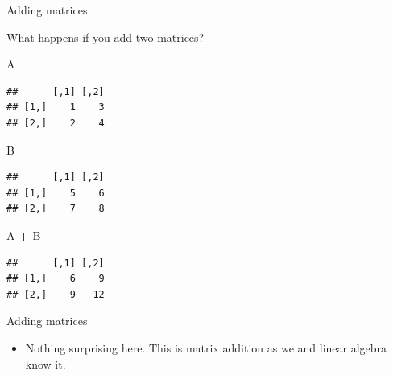 \documentclass[ignorenonframetext,]{beamer}
\newenvironment{Shaded}{\begin{snugshade}}{\end{snugshade}}
\newcommand{\NormalTok}[1]{#1}
\newcommand{\OperatorTok}[1]{\textcolor[rgb]{0.81,0.36,0.00}{\textbf{#1}}}
\newcommand{\StringTok}[1]{\textcolor[rgb]{0.31,0.60,0.02}{#1}}
\providecommand{\tightlist}{%
  \setlength{\itemsep}{0pt}\setlength{\parskip}{0pt}}
\begin{document}
\begin{frame}[fragile]{Adding matrices}
\protect\hypertarget{adding-matrices}{}

What happens if you add two matrices?

\begin{Shaded}
\begin{Highlighting}[]
\NormalTok{A}
\end{Highlighting}
\end{Shaded}

\begin{verbatim}
##      [,1] [,2]
## [1,]    1    3
## [2,]    2    4
\end{verbatim}

\begin{Shaded}
\begin{Highlighting}[]
\NormalTok{B}
\end{Highlighting}
\end{Shaded}

\begin{verbatim}
##      [,1] [,2]
## [1,]    5    6
## [2,]    7    8
\end{verbatim}

\begin{Shaded}
\begin{Highlighting}[]
\NormalTok{A }\OperatorTok{+}\StringTok{ }\NormalTok{B}
\end{Highlighting}
\end{Shaded}

\begin{verbatim}
##      [,1] [,2]
## [1,]    6    9
## [2,]    9   12
\end{verbatim}

\end{frame}

\begin{frame}{Adding matrices}
\protect\hypertarget{adding-matrices-1}{}

\begin{itemize}
\tightlist
\item
  Nothing surprising here. This is matrix addition as we and linear
  algebra know it.
\end{itemize}

\end{frame}
\end{document}

